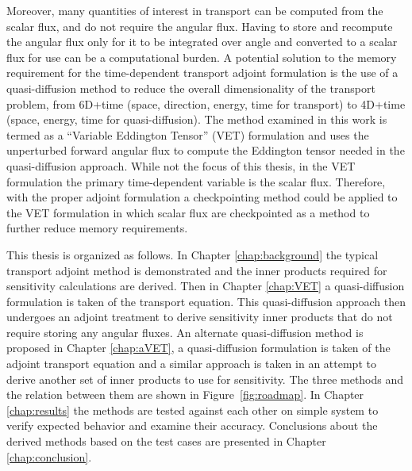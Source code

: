 \documentclass[12pt]{report}
\begin{document}
Moreover, many quantities of interest in transport can be computed from the scalar flux, and do not require the angular flux. Having to store and recompute the angular flux only for it to be integrated over angle and converted to a scalar flux for use can be a computational burden. A potential solution to the memory requirement for the time-dependent transport adjoint formulation is the use of a quasi-diffusion method to reduce the overall dimensionality of the transport problem, from 6D+time (space, direction, energy, time for transport) to 4D+time (space, energy, time for quasi-diffusion). The method examined in this work is termed  as a ``Variable Eddington Tensor'' (VET) formulation and uses the unperturbed forward angular flux to compute the Eddington tensor needed in the quasi-diffusion approach. While not the focus of this thesis, in the VET formulation the primary time-dependent variable is the scalar flux. Therefore, with the proper adjoint formulation a checkpointing method could be applied to the VET formulation in which scalar flux are checkpointed as a method to further reduce memory requirements.

This thesis is organized as follows. In Chapter \ref{chap:background} the typical transport adjoint method is demonstrated and the inner products required for sensitivity calculations are derived. Then in Chapter \ref{chap:VET} a quasi-diffusion formulation is taken of the transport equation. This quasi-diffusion approach then undergoes an adjoint treatment to derive sensitivity inner products that do not require storing any angular fluxes. An alternate quasi-diffusion method is proposed in Chapter \ref{chap:aVET}, a quasi-diffusion formulation is taken of the adjoint transport equation and a similar approach is taken in an attempt to derive another set of inner products to use for sensitivity. The three methods and the relation between them are shown in Figure~\ref{fig:roadmap}. In Chapter \ref{chap:results} the methods are tested against each other on simple system to verify expected behavior and examine their accuracy. Conclusions about the derived methods based on the test cases are presented in Chapter \ref{chap:conclusion}.
\end{document}
